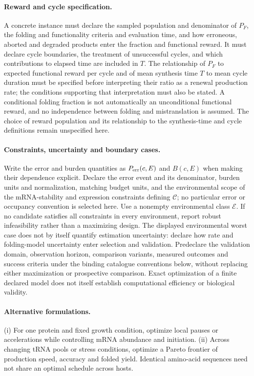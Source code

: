 \documentclass[11pt]{article}
\begin{document}
\paragraph{Reward and cycle specification.} A concrete instance must declare the sampled population and denominator of $P_F$, the folding and functionality criteria and evaluation time, and how erroneous, aborted and degraded products enter the fraction and functional reward. It must declare cycle boundaries, the treatment of unsuccessful cycles, and which contributions to elapsed time are included in $T$. The relationship of $P_F$ to expected functional reward per cycle and of mean synthesis time $T$ to mean cycle duration must be specified before interpreting their ratio as a renewal production rate; the conditions supporting that interpretation must also be stated. A conditional folding fraction is not automatically an unconditional functional reward, and no independence between folding and mistranslation is assumed. The choice of reward population and its relationship to the synthesis-time and cycle definitions remain unspecified here.
\paragraph{Constraints, uncertainty and boundary cases.} Write the error and burden quantities as $P_{\rm err}(c,E)$ and $B(c,E)$ when making their dependence explicit. Declare the error event and its denominator, burden units and normalization, matching budget units, and the environmental scope of the mRNA-stability and expression constraints defining $\mathcal C$; no particular error or occupancy convention is selected here. Use a nonempty environmental class $\mathcal E$. If no candidate satisfies all constraints in every environment, report robust infeasibility rather than a maximizing design. The displayed environmental worst case does not by itself quantify estimation uncertainty: declare how rate and folding-model uncertainty enter selection and validation. Predeclare the validation domain, observation horizon, comparison variants, measured outcomes and success criteria under the binding catalogue conventions below, without replacing either maximization or prospective comparison. Exact optimization of a finite declared model does not itself establish computational efficiency or biological validity.

\paragraph{Alternative formulations.} (i) For one protein and fixed growth condition, optimize local pauses or accelerations while controlling mRNA abundance and initiation. (ii) Across changing tRNA pools or stress conditions, optimize a Pareto frontier of production speed, accuracy and folded yield. Identical amino-acid sequences need not share an optimal schedule across hosts.
\end{document}
